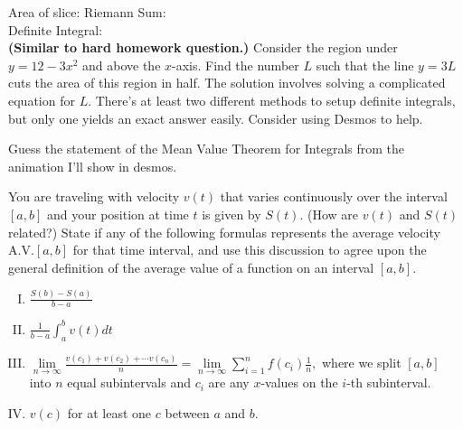 \documentclass[answers]{exam}
\begin{document}
\begin{questions}
Area of slice: \hspace{2in} Riemann Sum:\\

Definite Integral: \\

\question \textbf{(Similar to hard homework question.)} Consider the region under $y = 12-3x^2$ and above the $x$-axis. Find the number $L$ such that the line $y = 3L$ cuts the area of this region in half. The solution involves solving a complicated equation for $L$. There's at least two different methods to setup definite integrals, but only one yields an exact answer easily. Consider using Desmos to help. 

\hfill \break
\hfill \break
\hfill \break
\hfill \break
\hfill \break
\hfill \break
\hfill \break
\hfill \break
\hfill \break
\hfill \break
\hfill \break


\question Guess the statement of the Mean Value Theorem for Integrals from the animation I'll show in desmos.

\hfill \break
\hfill \break
\hfill \break
\hfill \break
\hfill \break
\hfill \break
\hfill \break
\hfill \break
\hfill \break


\question You are traveling with velocity $v(t)$ that varies continuously over the interval $[a, b]$ and your position at time $t$ is given by $S(t)$. (How are $v(t)$ and $S(t)$ related?) State if any of the following formulas represents the average velocity A.V.$[a,b]$ for that time interval, and use this discussion to agree upon the general definition of the average value of a function on an interval $[a,b]$.

\begin{enumerate}[(I)]
	
	\item $\displaystyle \frac{S(b)-S(a)}{b-a}$
	
	
	\item $\displaystyle \frac{1}{b-a}\int_a^b v(t) dt$
	
	
	\item $\displaystyle \lim\limits_{n\to \infty}\frac{v(c_1)+v(c_2)+\cdots v(c_n)}{n} = \lim\limits_{n\to \infty} \sum_{i=1}^n f(c_i) \frac{1}{n},$ where we split $[a, b]$ into $n$ equal subintervals and $c_i$ are any $x$-values on the $i$-th subinterval.
	
	
	\item $\displaystyle v(c)$ for at least one $c$ between $a$ and $b$.
	
	\hfill \break
	\hfill \break
	\hfill \break
	\hfill \break
	\hfill \break
	\hfill \break
	\hfill \break
	\hfill \break
	

\end{enumerate}
\end{questions}
\end{document}
